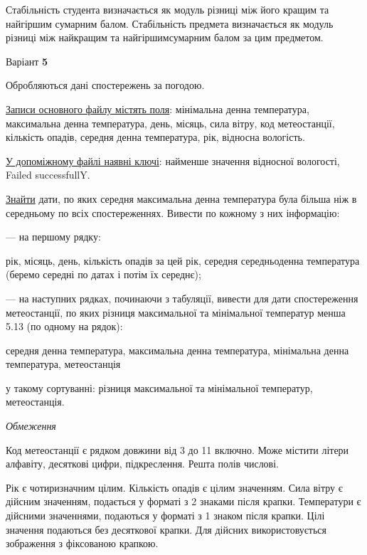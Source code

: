 \documentclass[11pt, ukrainian]{article}
\begin{document}
Стабільність студента визначається як модуль різниці між його кращим та найгіршим сумарним балом.
Стабільність предмета визначається як модуль різниці між найкращим та найгіршимсумарним балом за цим предметом.






\par
\newpage
{\center Варіант  \No \textbf { 5 }\par}
\bigskip
Обробляються дані спостережень за погодою. 

\underline{Записи основного файлу містять поля}: мінімальна денна температура, максимальна денна температура, день, місяць, сила вітру, код метеостанції, кількість опадів, середня денна температура, рік, відносна вологість.

\underline{У допоміжному файлі наявні ключі}: найменше значення відносної вологості, Failed successfullY.

\underline{Знайти} дати, по яких середня максимальна денна температура була більша ніж в середньому по всіх спостереженнях. Вивести по кожному з них інформацію:\par
{\noindent}--- на першому рядку:\par
рік, місяць, день, кількість опадів за цей рік, середня середньоденна температура (беремо середні по датах і потім їх середнє);

{\noindent}--- на наступних рядках, починаючи з табуляції, вивести для дати спостереження метеостанції, по яких різниця максимальної та мінімальної температур менша 5.13 (по одному на рядок):\par
середня денна температура, максимальна денна температура, мінімальна денна температура, метеостанція

{\noindent}у такому сортуванні: різниця максимальної та мінімальної температур, метеостанція.


\bigskip\textit{Обмеження}

Код метеостанції є рядком довжини від 3 до 11 включно.
Може містити літери алфавіту, десяткові цифри, підкреслення. Решта полів числові.

Рік є чотиризначним цілим.
Кількість опадів є цілим значенням.
Сила вітру є дійсним значенням, подається у форматі з 2 знаками після крапки.
Температури є дійсними значеннями, подаються у форматі з 1 знаком після крапки.
Цілі значення подаються без десяткової крапки.
Для дійсних використовується зображення з фіксованою крапкою.
\end{document}
